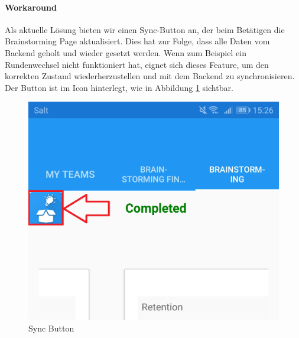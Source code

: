 \paragraph*{Workaround}
Als aktuelle Lösung bieten wir einen Sync-Button an, der beim Betätigen die Brainstorming Page aktualisiert. Dies hat zur Folge, dass alle Daten vom Backend geholt und wieder gesetzt werden. Wenn zum Beispiel ein Rundenwechsel nicht funktioniert hat, eignet sich dieses Feature, um den korrekten Zustand wiederherzustellen und mit dem Backend zu synchronisieren. Der Button ist im Icon hinterlegt, wie in Abbildung \ref{fig:sync-workaround} sichtbar.

\begin{figure}
	\centering
	\includegraphics[width=0.35\linewidth]{img/techn-bericht/sync-workaround}
	\caption{Sync Button}
	\label{fig:sync-workaround}
\end{figure}

